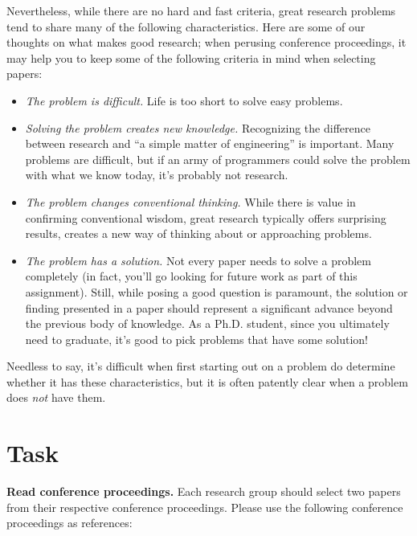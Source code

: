 \documentclass[11pt]{article}
\begin{document}
Nevertheless, while there are no hard and fast criteria, great research
problems tend to share many of the following characteristics.  Here are
some of our thoughts on what makes good research; when perusing
conference proceedings, it may help you to keep some of the following
criteria in mind when selecting papers:
\begin{itemize}
\item {\em The problem is difficult.}  Life is too short to solve easy
  problems. 
\item {\em Solving the problem creates new knowledge.} Recognizing the
  difference between research and ``a simple matter of engineering'' is
  important.  Many problems are difficult, but if an army of programmers
  could solve the problem with what we know today, it's probably not
  research.
\item {\em The problem changes conventional thinking.} While there is
  value in confirming conventional wisdom, great research typically
  offers surprising results, creates a new way of thinking about or
  approaching problems.
\item {\em The problem has a solution.} Not every paper needs to solve a
  problem completely (in fact, you'll go looking for future work as part
  of this assignment).  Still, while posing a good question is
  paramount, the solution or finding presented in a paper should
  represent a significant advance beyond the previous body of
  knowledge.  As a Ph.D. student, since you ultimately need to graduate,
  it's good to pick problems that have some solution!
\end{itemize}
\noindent
Needless to say, it's difficult when first starting out on a problem do
determine whether it has these characteristics, but it is often patently
clear when a problem does {\em not} have them.

\section{Task}


{\bf Read conference proceedings.}
Each research group should select two papers from their respective
conference proceedings.  Please use the following conference proceedings
as references:
\end{document}

